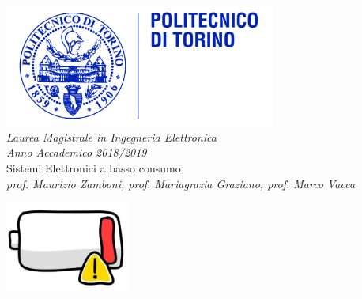 \begin{titlepage}
	
	\newcommand{\HRule}{\rule{\linewidth}{0.5mm}} %
	
	\center %
	
	\includegraphics[height=4cm]{immagini/polito.jpg}\\[1cm] %
	
	
\emph{{\Large Laurea Magistrale in Ingegneria Elettronica}}\\[0.25cm]
	\emph{{\large Anno Accademico 2018/2019}}\\[0.5cm] %
	{\huge\LARGE Sistemi Elettronici a basso consumo}\\[0.8cm] %
	\emph{{prof. Maurizio Zamboni, prof. Mariagrazia Graziano, prof. Marco Vacca}}\\[0.5cm] %
	
	
\begin{center}
			\includegraphics[height=3cm]{immagini/battery.jpg}
\end{center}


\end{titlepage}
